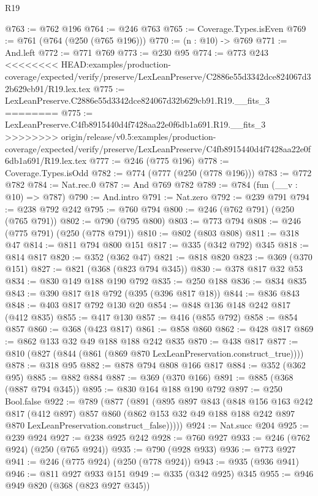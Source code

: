 \begin{lexlean}{R19}
\begin{coremodule}
{{{{{{{{{{{{{{@763 := @762 @196
@764 := @246 @763
@765 := Coverage.Types.isEven
@769 := @761 (@764 (@250 (@765 @196)))
@770 := (n : @10) -> @769
@771 := And.left
@772 := @771 @769
@773 := @230 @95
@774 := @773 @243
<<<<<<<< HEAD:examples/production-coverage/expected/verify/preserve/LexLeanPreserve/C2886e55d3342dce824067d32b629cb91/R19.lex.tex
@775 := LexLeanPreserve.C2886e55d3342dce824067d32b629cb91.R19.__fits_3
========
@775 := LexLeanPreserve.C4fb8915440d4f7428aa22e0f6db1a691.R19.__fits_3
>>>>>>>> origin/release/v0.5:examples/production-coverage/expected/verify/preserve/LexLeanPreserve/C4fb8915440d4f7428aa22e0f6db1a691/R19.lex.tex
@777 := @246 (@775 @196)
@778 := Coverage.Types.isOdd
@782 := @774 (@777 (@250 (@778 @196)))
@783 := @772 @782
@784 := Nat.rec.{0}
@787 := And @769 @782
@789 := @784 (fun (__v : @10) => @787)
@790 := And.intro
@791 := Nat.zero
@792 := @239 @791
@794 := @238 @792 @242
@795 := @760 @794
@800 := @246 (@762 @791) (@250 (@765 @791))
@802 := @790 (@795 @800)
@803 := @773 @794
@808 := @246 (@775 @791) (@250 (@778 @791))
@810 := @802 (@803 @808)
@811 := @318 @47
@814 := @811 @794 @800 @151
@817 := @335 (@342 @792) @345
@818 := @814 @817
@820 := @352 (@362 @47)
@821 := @818 @820
@823 := @369 (@370 @151)
@827 := @821 (@368 (@823 @794 @345))
@830 := @378 @817 @32 @53
@834 := @830 @149 @188 @190 @792
@835 := @250 @188
@836 := @834 @835
@843 := @390 @817 @18 @792 (@395 (@396 @817 @18))
@844 := @836 @843
@848 := @403 @817 @792 @130 @20
@854 := @848 @136 @148 @242 @817 (@412 @835)
@855 := @417 @130
@857 := @416 (@855 @792)
@858 := @854 @857
@860 := @368 (@423 @817)
@861 := @858 @860
@862 := @428 @817
@869 := @862 @133 @32 @49 @188 @188 @242 @835
@870 := @438 @817
@877 := @810 (@827 (@844 (@861 (@869 @870 LexLeanPreservation.construct_true))))
@878 := @318 @95
@882 := @878 @794 @808 @166 @817
@884 := @352 (@362 @95)
@885 := @882 @884
@887 := @369 (@370 @166)
@891 := @885 (@368 (@887 @794 @345))
@895 := @830 @164 @188 @190 @792
@897 := @250 Bool.false
@922 := @789
    (@877
      (@891
        (@895
          @897
          @843
          (@848
            @156
            @163
            @242
            @817
            (@412 @897)
            @857
            @860
            (@862 @153 @32 @49 @188 @188 @242 @897 @870 LexLeanPreservation.construct_false)))))
@924 := Nat.succ @204
@925 := @239 @924
@927 := @238 @925 @242
@928 := @760 @927
@933 := @246 (@762 @924) (@250 (@765 @924))
@935 := @790 (@928 @933)
@936 := @773 @927
@941 := @246 (@775 @924) (@250 (@778 @924))
@943 := @935 (@936 @941)
@946 := @811 @927 @933 @151
@949 := @335 (@342 @925) @345
@955 := @946 @949 @820 (@368 (@823 @927 @345))
}}}}}}}}}}}}}}
\end{coremodule}
\end{lexlean}
